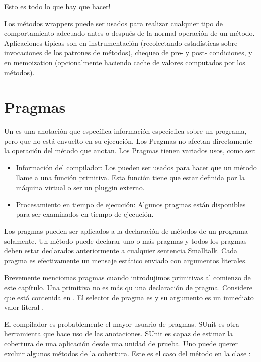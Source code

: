 \documentclass[a4paper,10pt,twoside]{book}
\begin{document}
Esto es todo lo que hay que hacer!

Los m\'etodos wrappers puede ser usados para realizar cualquier tipo de comportamiento adecuado antes o despu\'es de la normal operaci\'on de un m\'etodo. Aplicaciones t\'ipicas son en instrumentaci\'on (recolectando estad\'isticas sobre invocaciones de los patrones de m\'etodos), chequeo de pre- y post- condiciones,
y en memoization (opcionalmente haciendo cache de valores computados por los m\'etodos).

\section{Pragmas}

Un  es una anotación que espec\'ifica informaci\'on espec\'icfica sobre un programa, pero que no est\'a envuelto en su ejecuci\'on. Los Pragmas no afectan directamente la operaci\'on del m\'etodo que anotan. Los Pragmas tienen variados usos, como ser:

\begin{itemize}
\item Informaci\'on del compilador: Los  pueden ser usados para hacer que un m\'etodo llame a una funci\'on primitiva. Esta funci\'on tiene que estar definida por la m\'aquina virtual o ser un pluggin externo.

\item Procesamiento en tiempo de ejecuci\'on: Algunos pragmas est\'an disponibles para ser examinados en tiempo de ejecuci\'on.
\end{itemize}

Los pragmas pueden ser aplicados a la declaraci\'on de m\'etodos de un programa solamente. Un m\'etodo puede declarar uno o m\'as pragmas y todos los pragmas deben estar declarados anteriormente a cualquier sentencia Smalltalk. Cada pragma es efectivamente un mensaje est\'atico enviado con argumentos literales.

Brevemente menciomas pragmas cuando introdujimos primitivas al comienzo de este cap\'itulo. Una primitiva no es m\'as qu una declaraci\'on de pragma. Considere  que est\'a contenida en . El selector de pragma es  y su argumento es un inmediato valor literal .

El compilador es probablemente el mayor usuario de pragmas. SUnit es otra herramienta que hace uso de las anotaciones. SUnit es capaz de estimar la cobertura de una aplicaci\'on desde una unidad de prueba. Uno puede querer excluir algunos m\'etodos de la cobertura. Este es el caso del m\'etodo  en la clase :  
\end{document}
